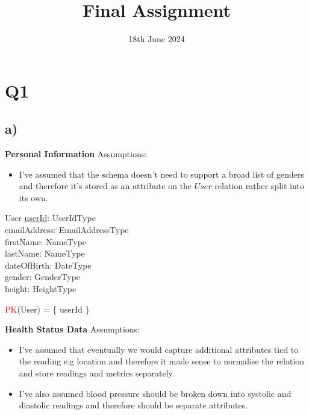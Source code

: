 \documentclass{article}
\title{Final Assignment}
\date{\vspace{-1.0cm}18th June 2024}
\begin{document}
\maketitle

\section*{Q1}

\subsection*{\small a)}

\textbf{Personal Information}
\newline \newline Assumptions:
\begin{itemize}
    \item I've assumed that the schema doesn't need to support a broad list of genders and therefore it’s stored as an attribute on the $User$ relation rather split into its own.
\end{itemize}

\begin{schema}{User}
	\underline{userId}: UserIdType \\
    emailAddress: EmailAddressType \\
	firstName: NameType \\
	lastName: NameType \\
    dateOfBirth: DateType \\
    gender: GenderType \\
    height: HeightType \\ 
\end{schema}

\begin{zed}
\textcolor{red}{PK}(User) = \{ userId \} \\
\end{zed}

\vspace{0.2cm}
\hspace{-0.5cm}\textbf{Health Status Data}
\newline \newline Assumptions:
\begin{itemize}
  \item I've assumed that eventually we would capture additional attributes tied to the reading e.g location and therefore it made sense to normalise the relation and store readings and metrics separately.
  \item I've also assumed blood pressure should be broken down into systolic and diastolic readings and therefore should be separate attributes.
\end{itemize}
\end{document}
